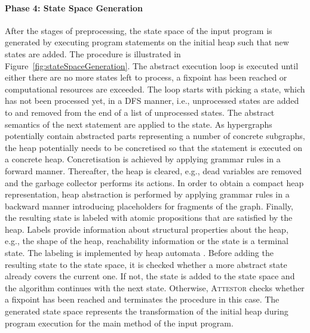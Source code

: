 \documentclass[a4paper, 12pt, twoside]{report}
\begin{document}
	\paragraph{Phase 4: State Space Generation}	
	After the stages of preprocessing, the state space of the input program is generated by executing program statements on the initial heap such that new states are added. The procedure is illustrated in Figure~\ref{fig:stateSpaceGeneration}. The abstract execution loop is executed until either there are no more states left to process, a fixpoint has been reached or computational resources are exceeded. The loop starts with picking a state, which has not been processed yet, in a DFS manner, i.e., unprocessed states are added to and removed from the end of a list of unprocessed states. The abstract semantics of the next statement are applied to the state. As hypergraphs potentially contain abstracted parts representing a number of concrete subgraphs, the heap potentially needs to be concretised so that the statement is executed on a concrete heap. Concretisation is achieved by applying grammar rules in a forward manner. Thereafter, the heap is cleared, e.g., dead variables are removed and the garbage collector performs its actions. In order to obtain a compact heap representation, heap abstraction is performed by applying grammar rules in a backward manner introducing placeholders for fragments of the graph. Finally, the resulting state is labeled with atomic propositions that are satisfied by the heap. Labels provide information about structural properties about the heap, e.g., the shape of the heap, reachability information or the state is a terminal state. The labeling is implemented by heap automata \cite{arndt2018let}. Before adding the resulting state to the state space, it is checked whether a  more abstract state already covers the current one. If not, the state is added to the state space and the algorithm continues with the next state. Otherwise, \textsc{Attestor} checks whether a fixpoint has been reached and terminates the procedure in this case. The generated state space represents the transformation of the initial heap during program execution for the main method of the input program.
	
\end{document}

